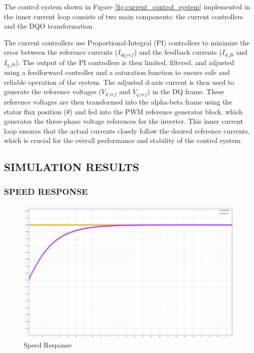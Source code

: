 The control system shown in Figure \ref{fig:current_control_system} implemented in the inner current loop consists of two main components: the current controllers and the DQO transformation.

The current controllers use Proportional-Integral (PI) controllers to minimize the error between the reference currents ($I_{dq\_{ref}}$) and the feedback currents ($I_{d\_fb}$ and $I_{q\_fb}$). The output of the PI controllers is then limited, filtered, and adjusted using a feedforward controller and a saturation function to ensure safe and reliable operation of the system. The adjusted d-axis current is then used to generate the reference voltages ($V_{d\_{ref}}$ and $V_{q\_{ref}}$) in the DQ frame. These reference voltages are then transformed into the alpha-beta frame using the stator flux position ($\theta$) and fed into the PWM reference generator block, which generates the three-phase voltage references for the inverter. This inner current loop ensures that the actual currents closely follow the desired reference currents, which is crucial for the overall performance and stability of the control system.



\subsection{SIMULATION RESULTS}



\subsubsection{SPEED RESPONSE}

\begin{figure}[H]
	\centering
	\includegraphics[width=6in]{sections/section3/images/simulationResutls/SpeedTrackingNoCursor.png}
	\caption{Speed Response}
	\label{fig:speed_response}
\end{figure}

